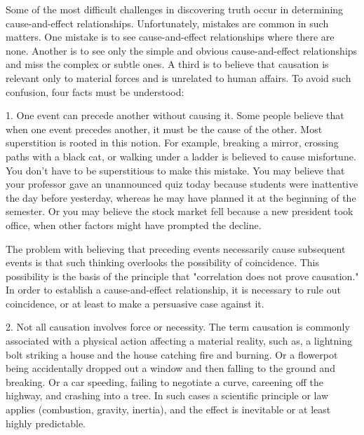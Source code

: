 \documentclass{book}
\begin{document}
Some of the most difficult challenges in discovering truth occur in determining cause-and-effect relationships. Unfortunately, mistakes are common in such matters. One mistake is to see cause-and-effect relationships where there are none. Another is to see only the simple and obvious cause-and-effect relationships and miss the complex or subtle ones. A third is to believe that causation is relevant only to material forces and is unrelated to human affairs. To avoid such confusion, four facts must be understood:

1. One event can precede another without causing it. Some people believe that when one event precedes another, it must be the cause of the other. Most superstition is rooted in this notion. For example, breaking a mirror, crossing paths with a black cat, or walking under a ladder is believed to cause misfortune. You don’t have to be superstitious to make this mistake. You may believe that your professor gave an unannounced quiz today because students were inattentive the day before yesterday, whereas he may have planned it at the beginning of the semester. Or you may believe the stock market fell because a new president took office, when other factors might have prompted the decline. 

The problem with believing that preceding events necessarily cause subsequent events is that such thinking overlooks the possibility of coincidence.  This possibility is the basis of the principle that "correlation does not prove causation." In order to establish a cause-and-effect relationship, it is necessary to rule out coincidence, or at least to make a persuasive case against it.

2. Not all causation involves force or necessity. The term causation is commonly associated with a physical action affecting a material reality, such as, a lightning bolt striking a house and the house catching fire and burning. Or a flowerpot being accidentally dropped out a window and then falling to the ground and breaking. Or a car speeding, failing to negotiate a curve, careening off the highway, and crashing into a tree. In such cases a scientific principle or law applies (combustion, gravity, inertia), and the effect is inevitable or at least highly predictable. 
\end{document}
